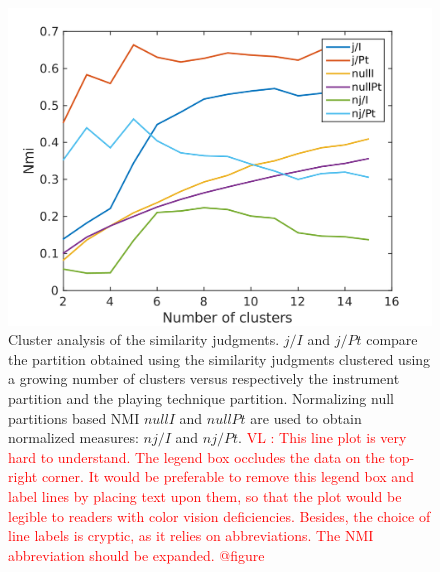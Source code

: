\documentclass{article}
\newcommand{\vl}[1]{\textcolor{red}{VL : #1}}
\begin{document}
\begin{figure}
\center
\includegraphics[width = \textwidth]{figures/clusterAnalysis.png}
\caption{Cluster analysis of the similarity judgments. $j/I$ and $j/Pt$ compare the partition obtained using the similarity judgments clustered using a growing number of clusters versus respectively the instrument partition and the playing technique partition. Normalizing null partitions based NMI $nullI$ and $nullPt$ are used to obtain normalized measures: $nj/I$ and $nj/Pt$.
\vl{This line plot is very hard to understand.
The legend box occludes the data on the top-right corner.
It would be preferable to remove this legend box and label lines
by placing text upon them,
so that the plot would be legible to readers with color vision deficiencies.
Besides, the choice of line labels is cryptic, as it relies on abbreviations.
The NMI abbreviation should be expanded.
@figure}}
\label{fig:clusters}
\end{figure}
\end{document}
